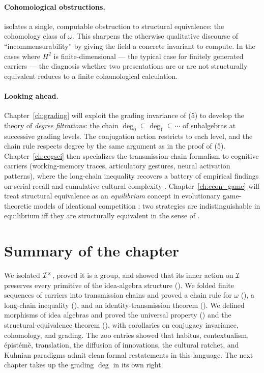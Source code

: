 \paragraph{Cohomological obstructions.} 
isolates a single, computable obstruction to structural equivalence:
the cohomology class of $\omega$. This sharpens the otherwise
qualitative discourse of ``incommensurability''
\cite{Kuhn1962,Foucault1969,Bedau1997} by giving the field a concrete
invariant to compute. In the cases where $H^2$ is finite-dimensional
--- the typical case for finitely generated carriers
\cite{Brown1982,Weibel1994} --- the diagnosis whether two
presentations are or are not structurally equivalent reduces to a
finite cohomological calculation.

\paragraph{Looking ahead.} Chapter~\ref{ch:grading} will exploit the
grading invariance of (5) to develop the theory
of \emph{degree filtrations}: the chain $\deg_0\subseteq\deg_1\subseteq
\cdots$ of subalgebras at successive grading levels. The conjugation
action restricts to each level, and the chain rule respects degree by
the same argument as in the proof of (5).
Chapter~\ref{ch:cogsci} then specializes the transmission-chain
formalism to cognitive carriers (working-memory traces, articulatory
gestures, neural activation patterns), where the long-chain
inequality recovers a battery of empirical findings on serial recall
and cumulative-cultural complexity \cite{Henrich2015,Sperber1996}.
Chapter~\ref{ch:econ_game} will treat structural equivalence as an
\emph{equilibrium} concept in evolutionary game-theoretic models of
ideational competition \cite{MaynardSmith1982}: two strategies are
indistinguishable in equilibrium iff they are structurally
equivalent in the sense of .

\section*{Summary of the chapter}

We isolated $\mathcal{I}^{\times}$, proved it is a group, and showed that
its inner action on $\mathcal{I}$ preserves every primitive of the
idea-algebra structure (). We folded finite
sequences of carriers into transmission chains and proved a chain rule
for $\omega$ (), a long-chain inequality
(), and an identity-transmission theorem
(). We defined morphisms of idea algebras and
proved the universal property () and the
structural-equivalence theorem (), with
corollaries on conjugacy invariance, cohomology, and grading. The zoo
entries showed that habitus, contextualism, épistémè, translation, the
diffusion of innovations, the cultural ratchet, and Kuhnian paradigms
admit clean formal restatements in this language. The next chapter
takes up the grading $\deg$ in its own right.
